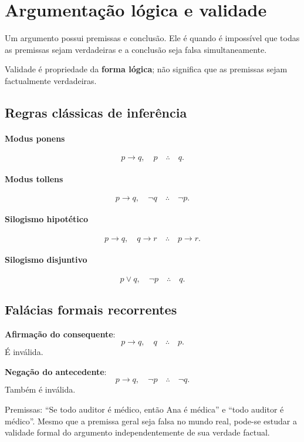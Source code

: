 \section{Argumentação lógica e validade}

Um argumento possui premissas e conclusão. Ele é  quando é impossível que todas as premissas sejam verdadeiras e a conclusão seja falsa simultaneamente.

Validade é propriedade da \textbf{forma lógica}; não significa que as premissas sejam factualmente verdadeiras.

\subsection{Regras clássicas de inferência}

\paragraph{Modus ponens}
\[
p\to q,\quad p \quad\therefore\quad q.
\]

\paragraph{Modus tollens}
\[
p\to q,\quad \neg q \quad\therefore\quad \neg p.
\]

\paragraph{Silogismo hipotético}
\[
p\to q,\quad q\to r \quad\therefore\quad p\to r.
\]

\paragraph{Silogismo disjuntivo}
\[
p\lor q,\quad \neg p \quad\therefore\quad q.
\]

\subsection{Falácias formais recorrentes}

\textbf{Afirmação do consequente}:
\[
p\to q,\quad q \quad\therefore\quad p.
\]
É inválida.

\textbf{Negação do antecedente}:
\[
p\to q,\quad \neg p \quad\therefore\quad \neg q.
\]
Também é inválida.

\begin{exemplo}
Premissas: ``Se todo auditor é médico, então Ana é médica'' e ``todo auditor é médico''. Mesmo que a premissa geral seja falsa no mundo real, pode-se estudar a validade formal do argumento independentemente de sua verdade factual.
\end{exemplo}

